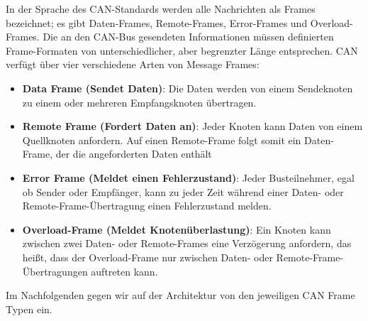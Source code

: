 In der Sprache des CAN-Standards werden alle Nachrichten als Frames bezeichnet; es gibt Daten-Frames, Remote-Frames, Error-Frames und Overload-Frames. Die an den CAN-Bus gesendeten Informationen müssen definierten Frame-Formaten von unterschiedlicher, aber begrenzter Länge entsprechen.
CAN verfügt über vier verschiedene Arten von Message Frames:

\begin{itemize}
	\item \textbf{Data Frame (Sendet Daten)}: Die Daten werden von einem Sendeknoten zu einem oder mehreren Empfangsknoten übertragen.
	\item \textbf{Remote Frame (Fordert Daten an)}: Jeder Knoten kann Daten von einem Quellknoten anfordern. Auf einen Remote-Frame folgt somit ein Daten-Frame, der die angeforderten Daten enthält
	\item \textbf{Error Frame (Meldet einen Fehlerzustand)}: Jeder Busteilnehmer, egal ob Sender oder Empfänger, kann zu jeder Zeit während einer Daten- oder Remote-Frame-Übertragung einen Fehlerzustand melden.
	\item \textbf{Overload-Frame  (Meldet Knotenüberlastung)}: Ein Knoten kann zwischen zwei Daten- oder Remote-Frames eine Verzögerung anfordern, das heißt, dass der Overload-Frame nur zwischen Daten- oder Remote-Frame-Übertragungen auftreten kann.
\end{itemize}

Im Nachfolgenden gegen wir auf der Architektur von den jeweiligen CAN Frame Typen ein.
